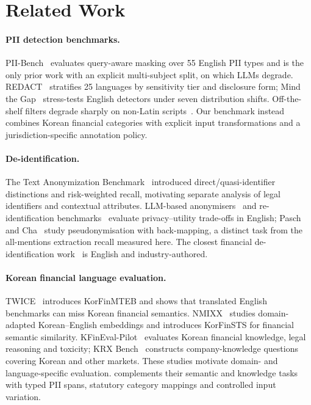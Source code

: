\section{Related Work}
\label{sec:related}

\paragraph{PII detection benchmarks.}
PII-Bench~\cite{shen2025piibench} evaluates query-aware masking over 55 English PII types and is the only prior work with an explicit multi-subject split, on which LLMs degrade. REDACT~\cite{vats2026redact} stratifies 25 languages by sensitivity tier and disclosure form; Mind the Gap~\cite{zafar2026mindthegap} stress-tests English detectors under seven distribution shifts. Off-the-shelf filters degrade sharply on non-Latin scripts~\cite{uppala2026opf}. Our benchmark instead combines Korean financial categories with explicit input transformations and a jurisdiction-specific annotation policy.

\paragraph{De-identification.}
The Text Anonymization Benchmark~\cite{pilan2022tab} introduced direct/quasi-identifier distinctions and risk-weighted recall, motivating separate analysis of legal identifiers and contextual attributes. LLM-based anonymisers~\cite{staab2025anonymizers,yang2025rupta} and re-identification benchmarks~\cite{krco2026ratbench} evaluate privacy--utility trade-offs in English; Pasch and Cha~\cite{pasch2025privacyutility} study pseudonymisation with back-mapping, a distinct task from the all-mentions extraction recall measured here. The closest financial de-identification work~\cite{albanese2026anonymous} is English and industry-authored.

\paragraph{Korean financial language evaluation.}
TWICE~\cite{hwang2025twice} introduces KorFinMTEB and shows that translated English benchmarks can miss Korean financial semantics. NMIXX~\cite{lee2025nmixx} studies domain-adapted Korean--English embeddings and introduces KorFinSTS for financial semantic similarity. KFinEval-Pilot~\cite{hwang2025kfineval} evaluates Korean financial knowledge, legal reasoning and toxicity; KRX Bench~\cite{son2024krx} constructs company-knowledge questions covering Korean and other markets. These studies motivate domain- and language-specific evaluation. \kiii{} complements their semantic and knowledge tasks with typed PII spans, statutory category mappings and controlled input variation.

